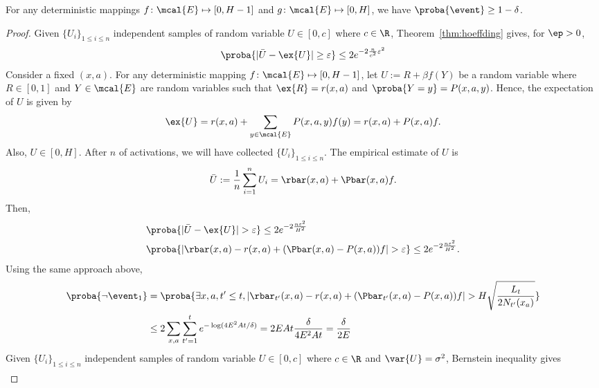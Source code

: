             \begin{lem}
            \label{lem:high_prob}
                For any deterministic mappings $f\colon \mcal{E}\mapsto[0,H-1]$ and $g\colon \mcal{E}\mapsto[0,H]$, we have $\proba{\event}\ge1-\delta$.
            \end{lem}
            \begin{proof}
            Given $\{U_i\}_{1\le i\le n}$ independent samples of random variable $U\in[0, c]$ where $c\in\R$, Theorem~\ref{thm:hoeffding} gives, for $\ep>0$,
            \begin{align*}
            \proba{|\bar{U}-\ex{U}|\ge \varepsilon} \le 2e^{-2\frac{n}{c^2}\varepsilon^2}
            \end{align*}
            Consider a fixed $(x,a)$.
            For any deterministic mapping $f\colon\mcal{E}\mapsto[0,H-1]$, let $U:=R+\beta f(Y)$ be a random variable where $R\in[0,1]$ and $Y\in\mcal{E}$ are random variables such that $\ex{R}=r(x,a)$ and $\proba{Y=y}=P(x,a,y)$.
            Hence, the expectation of $U$ is given by 
            \begin{align*}
            \ex{U}=r(x,a) +\sum_{y\in\mcal{E}}P(x,a,y)f(y)=r(x,a) +P(x,a)f.
            \end{align*}
            Also, $U\in [0,H]$.
            After $n$ of activations, we will have collected $\{U_i\}_{1\le i\le n}$.
            The empirical estimate of $U$ is
            $$\bar{U}:=\frac1n\sum_{i=1}^{n} U_i=\rbar(x,a) +\Pbar(x,a)f.$$
            Then,
            \begin{align*}
            &\proba{\vert\bar{U}-\ex{U}\vert >\varepsilon} \le2e^{-2\frac{n\varepsilon^2}{H^2}} \\
            &\proba{\vert \rbar(x,a)-r(x,a) +(\Pbar(x,a) -P(x,a))f\vert >\varepsilon} \le2e^{-2\frac{n\varepsilon^2}{H^2}}.
            \end{align*}
            Using the same approach above,
            \begin{align*}
            \proba{\neg\event_1} 
            &=\proba{\exists x,a, t'\le t,|\rbar_{t'}(x,a)-r(x,a)+(\Pbar_{t'}(x,a)-P(x,a))f| >H\sqrt{\frac{L_t}{2N_{t'}(x_a)}}} \\
            &\le2\sum_{x,a} \sum_{t'=1}^{t}e^{-\log(4E^2At/\delta)} =2EAt\frac{\delta}{4E^2At}=\frac{\delta}{2E}
            \end{align*}
            Given $\{U_i\}_{1\le i\le n}$ independent samples of random variable $U\in[0, c]$ where $c\in\R$ and $\var{U}=\sigma^2$, Bernstein inequality gives
            \begin{align*}

\end{align*}
\end{proof}
